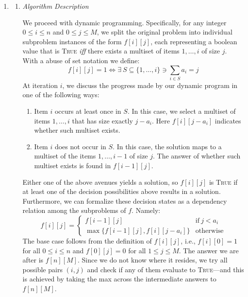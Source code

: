 \documentclass{article}
\begin{document}
\begin{enumerate}[leftmargin={*}, font={\bf}, label={\arabic*.}, ref={\arabic*}]
  \item \label{qst:1}
    \begin{enumerate}
      \item \label{qst:1a}
        {\itshape Algorithm Description}

        We proceed with dynamic programming. Specifically, for any integer $0 \leq i \leq n$ and
        $0 \leq j \leq M$, we split the original problem into individual subproblem instances of
        the form $f[i][j]$, each representing a boolean value that is \textsc{True} \textit{iff}
        there exists a multiset of items $1, \ldots, i$ of size $j$. With a abuse of set notation
        we define:
        \[
          f[i][j] = 1 \iff \exists\ S \subseteq \{1, \ldots, i\} \ni \sum_{i \in S} a_i = j
        \]
        At iteration $i$, we discuss the progress made by our dynamic program in one of the
        following ways:
        \begin{enumerate}[label={(\arabic*)}, itemsep={0pt}]
          \item
            Item $i$ occurs at least once in $S$. In this case, we select a multiset of items $1,
            \ldots, i$ that has size exactly $j-a_i$. Here $f[i][j-a_i]$ indicates whether such
            multiset exists.
          \item
            Item $i$ does not occur in $S$. In this case, the solution maps to a multiset of the
            items $1, \ldots, i-1$ of size $j$. The answer of whether such multiset exists is found
            in $f[i-1][j]$.
        \end{enumerate}
        Either one of the above avenues yields a solution, so $f[i][j]$ is \textsc{True} if at least
        one of the decision possibilities above results in a solution. Furthermore, we can formalize
        these decision states as a dependency relation among the subproblems of $f$. Namely:
        \[
          f[i][j] = 
          \begin{cases}
            f[i-1][j] & \text{if}\ j < a_i \\
            \max\big\{f[i-1][j], f[i][j-a_i]\big\} & \text{otherwise}
          \end{cases}
        \]
        The base case follows from the definition of $f[i][j]$, i.e., $f[i][0] = 1$ for all $0 \leq
        i \leq n$ and $f[0][j] = 0$ for all $1 \leq j \leq M$. The answer we are after is $f[n][M]$.
        Since we do not know where it resides, we try all possible pairs $(i,j)$ and check if any of
        them evaluate to \textsc{True}---and this is achieved by taking the max across the intermediate
        answers to $f[n][M]$.


\end{enumerate}
\end{enumerate}
\end{document}
